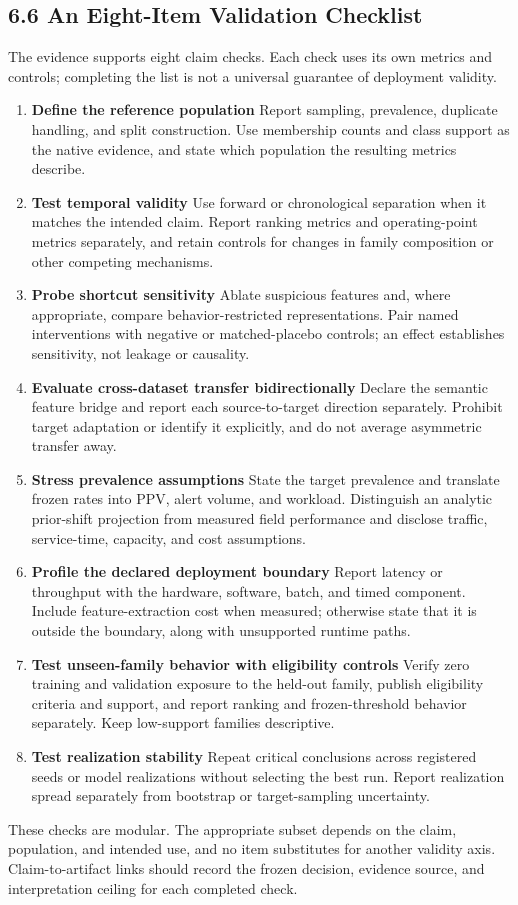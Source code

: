 \documentclass[preprint,12pt]{elsarticle}
\begin{document}
\subsection{6.6 An Eight-Item Validation Checklist}
The evidence supports eight claim checks. Each check uses its own metrics and controls; completing the list is not a universal guarantee of deployment validity.
\begin{enumerate}
\item \textbf{Define the reference population} Report sampling, prevalence, duplicate handling, and split construction. Use membership counts and class support as the native evidence, and state which population the resulting metrics describe.
\item \textbf{Test temporal validity} Use forward or chronological separation when it matches the intended claim. Report ranking metrics and operating-point metrics separately, and retain controls for changes in family composition or other competing mechanisms.
\item \textbf{Probe shortcut sensitivity} Ablate suspicious features and, where appropriate, compare behavior-restricted representations. Pair named interventions with negative or matched-placebo controls; an effect establishes sensitivity, not leakage or causality.
\item \textbf{Evaluate cross-dataset transfer bidirectionally} Declare the semantic feature bridge and report each source-to-target direction separately. Prohibit target adaptation or identify it explicitly, and do not average asymmetric transfer away.
\item \textbf{Stress prevalence assumptions} State the target prevalence and translate frozen rates into PPV, alert volume, and workload. Distinguish an analytic prior-shift projection from measured field performance and disclose traffic, service-time, capacity, and cost assumptions.
\item \textbf{Profile the declared deployment boundary} Report latency or throughput with the hardware, software, batch, and timed component. Include feature-extraction cost when measured; otherwise state that it is outside the boundary, along with unsupported runtime paths.
\item \textbf{Test unseen-family behavior with eligibility controls} Verify zero training and validation exposure to the held-out family, publish eligibility criteria and support, and report ranking and frozen-threshold behavior separately. Keep low-support families descriptive.
\item \textbf{Test realization stability} Repeat critical conclusions across registered seeds or model realizations without selecting the best run. Report realization spread separately from bootstrap or target-sampling uncertainty.
\end{enumerate}
These checks are modular. The appropriate subset depends on the claim, population, and intended use, and no item substitutes for another validity axis. Claim-to-artifact links should record the frozen decision, evidence source, and interpretation ceiling for each completed check.
\end{document}
